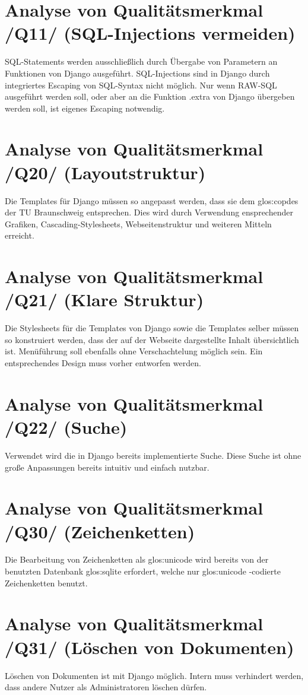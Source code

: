 \section{Analyse von Qualitätsmerkmal /Q11/ (SQL-Injections vermeiden)}

SQL-Statements werden ausschließlich durch Übergabe von Parametern an 
Funktionen von Django ausgeführt. SQL-Injections sind in Django durch 
integriertes Escaping von SQL-Syntax nicht möglich. Nur wenn RAW-SQL 
ausgeführt werden soll, oder aber an die Funktion .extra von Django 
übergeben werden soll, ist eigenes Escaping notwendig.

\section{Analyse von Qualitätsmerkmal /Q20/ (Layoutstruktur)}

Die Templates für Django müssen so angepasst werden, dass sie dem
\Gls{glos:copdes}  der TU Braunschweig entsprechen. Dies wird durch Verwendung
ensprechender Grafiken, Cascading-Stylesheets, Webseitenstruktur und weiteren
Mitteln erreicht.


\section{Analyse von Qualitätsmerkmal /Q21/ (Klare Struktur)}

Die Stylesheets für die Templates von Django sowie die Templates selber
müssen so konstruiert werden, dass der auf der Webseite dargestellte 
Inhalt übersichtlich ist. Menüführung soll ebenfalls ohne Verschachtelung
möglich sein. Ein entsprechendes Design muss vorher entworfen werden.


\section{Analyse von Qualitätsmerkmal /Q22/ (Suche)}

Verwendet wird die in Django bereits implementierte Suche. Diese Suche ist ohne
große Anpassungen bereits intuitiv und einfach nutzbar.


\section{Analyse von Qualitätsmerkmal /Q30/ (Zeichenketten)} 

Die Bearbeitung von Zeichenketten als \Gls{glos:unicode} wird bereits von der benutzten
Datenbank \Gls{glos:sqlite} erfordert, welche nur \Gls{glos:unicode} -codierte Zeichenketten benutzt.


\section{Analyse von Qualitätsmerkmal /Q31/ (Löschen von Dokumenten)} 

Löschen von Dokumenten ist mit Django möglich. Intern muss verhindert werden,
dass andere Nutzer als Administratoren löschen dürfen.

